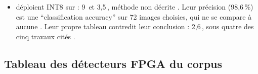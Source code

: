 \begin{itemize}
    qu'en DDR . Ils obtiennent 24,3\,, 41,59\, et 2,13\, de portée non
    précisée $^{m}$. Leur précision est une \enquote{accuracy}
    (TP+TN)/(TP+TN+FP+FN), mal définie pour la détection (Eq.~4), et aucune baseline
    flottante ne mesure la perte due à la compression. Leur GPU de comparaison, une
    RTX~2070 de bureau, va plus vite (44,64\,, ).
  \item \citet{arxiv-2507.18174-real-time-object-detection-classification} déploient
     INT8 sur  : 9\, et 3,5\,, méthode non décrite . Leur
    précision (98,6\,\%) est une \enquote{classification accuracy} sur 72 images
    choisies, qui ne se compare à aucune . Leur propre tableau contredit leur
    conclusion : 2,6\,, sous quatre des cinq travaux cités .
\end{itemize}

\subsection{Tableau des détecteurs FPGA du corpus}


